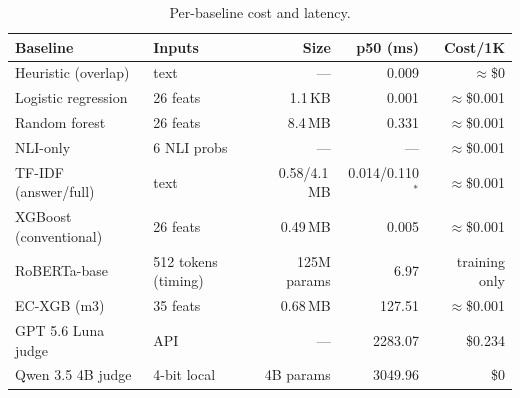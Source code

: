\documentclass[a4paper,fleqn]{cas-sc}
\begin{document}
\begin{table}[pos=htbp]
  \centering
  \caption{Per-baseline cost and latency.}
  \label{tab:cost}
  \begin{tabular}{llrrr}
    \toprule
    \textbf{Baseline}      & \textbf{Inputs} & \textbf{Size} & \textbf{p50 (ms)} & \textbf{Cost/1K} \\
    \midrule
    Heuristic (overlap)    & text            & ---           & 0.009                   & $\approx$\$0     \\
    Logistic regression    & 26 feats        & 1.1\,KB       & 0.001                   & $\approx$\$0.001 \\
    Random forest          & 26 feats        & 8.4\,MB       & 0.331                   & $\approx$\$0.001 \\
    NLI-only               & 6 NLI probs     & ---           & ---                     & $\approx$\$0.001 \\
    TF-IDF (answer/full)   & text            & 0.58/4.1\,MB  & 0.014/0.110$^\ast$      & $\approx$\$0.001 \\
    XGBoost (conventional) & 26 feats        & 0.49\,MB      & 0.005                   & $\approx$\$0.001 \\
    RoBERTa-base           & 512 tokens (timing) & 125M params & 6.97                  & training only    \\
    EC-XGB (m3)            & 35 feats        & 0.68\,MB      & 127.51                  & $\approx$\$0.001 \\
    GPT 5.6 Luna judge     & API             & ---           & 2283.07                 & \$0.234          \\
    Qwen 3.5 4B judge      & 4-bit local     & 4B params     & 3049.96                 & \$0              \\
    \bottomrule
  \end{tabular}
\end{table}
\end{document}
